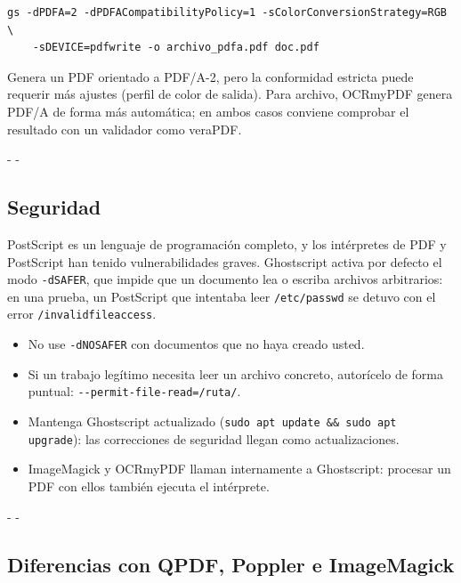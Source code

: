 \documentclass[11pt,a4paper]{article}
\makeatletter
\newcommand{\necesitaespacio}[1]{\par\penalty-100\begingroup
	\setlength{\dimen@}{#1}\dimen@ii\pagegoal\advance\dimen@ii-\pagetotal
	\ifdim\dimen@>\dimen@ii\ifdim\dimen@ii>\z@\vfil\fi\penalty-\@M\fi\endgroup}
\newcommand{\cmd}[1]{\texttt{\textcolor{colcmd}{#1}}}      %
\newcommand{\opt}[1]{\texttt{\textcolor{colopt}{#1}}}      %
\newcommand{\arch}[1]{\texttt{\textcolor{colarch}{#1}}}    %
\makeatother
\begin{document}
	\begin{lstlisting}
gs -dPDFA=2 -dPDFACompatibilityPolicy=1 -sColorConversionStrategy=RGB \
    -sDEVICE=pdfwrite -o archivo_pdfa.pdf doc.pdf
\end{lstlisting}
	
	Genera un PDF orientado a PDF/A-2, pero la conformidad estricta puede requerir más ajustes (perfil de color de salida). Para archivo, OCRmyPDF genera PDF/A de forma más automática; en ambos casos conviene comprobar el resultado con un validador como veraPDF.
	
	\necesitaespacio{8\baselineskip}
	\subsection{Seguridad}\label{sec:gs-seguridad}
	
	PostScript es un lenguaje de programación completo, y los intérpretes de PDF y PostScript han tenido vulnerabilidades graves. Ghostscript activa por defecto el modo \opt{-dSAFER}, que impide que un documento lea o escriba archivos arbitrarios: en una prueba, un PostScript que intentaba leer \arch{/etc/passwd} se detuvo con el error \texttt{/\allowbreak{}invalidfileaccess}.
	
	\begin{itemize}
		\item No use \opt{-dNOSAFER} con documentos que no haya creado usted.
		\item Si un trabajo legítimo necesita leer un archivo concreto, autorícelo de forma puntual: \opt{-{}-permit-\allowbreak{}file-\allowbreak{}read=\allowbreak{}/\allowbreak{}ruta/}.
		\item Mantenga Ghostscript actualizado (\cmd{sudo apt update \&\& sudo apt upgrade}): las correcciones de seguridad llegan como actualizaciones.
		\item ImageMagick y OCRmyPDF llaman internamente a Ghostscript: procesar un PDF con ellos también ejecuta el intérprete.
	\end{itemize}
	
	\necesitaespacio{24\baselineskip}
	\subsection{Diferencias con QPDF, Poppler e ImageMagick}
	
\end{document}
